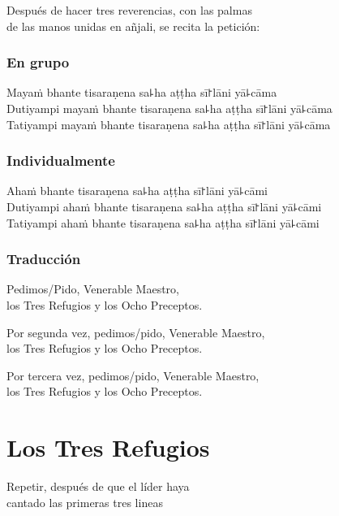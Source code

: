 \begin{instruction}
  Después de hacer tres reverencias, con las palmas\\
  de las manos unidas en añjali, se recita la petición:
\end{instruction}

\subsection{En grupo}

Mayaṁ bhante tisaraṇena sa꜕ha aṭṭha sī꜓lāni yā꜕cāma\\
Dutiyampi mayaṁ bhante tisaraṇena sa꜕ha aṭṭha sī꜓lāni yā꜕cāma\\
Tatiyampi mayaṁ bhante tisaraṇena sa꜕ha aṭṭha sī꜓lāni yā꜕cāma

\subsection{Individualmente}

Ahaṁ bhante tisaraṇena sa꜕ha aṭṭha sī꜓lāni yā꜕cāmi\\
Dutiyampi ahaṁ bhante tisaraṇena sa꜕ha aṭṭha sī꜓lāni yā꜕cāmi\\
Tatiyampi ahaṁ bhante tisaraṇena sa꜕ha aṭṭha sī꜓lāni yā꜕cāmi

\subsection{Traducción}

\begin{english}
  Pedimos/Pido, Venerable Maestro,\\
  \vin los Tres Refugios y los Ocho Preceptos.

  Por segunda vez, pedimos/pido, Venerable Maestro,\\
  \vin los Tres Refugios y los Ocho Preceptos.

  Por tercera vez, pedimos/pido, Venerable Maestro,\\
  \vin los Tres Refugios y los Ocho Preceptos.
\end{english}

\clearpage
\chapter{Los Tres Refugios}

\begin{instruction}
  Repetir, después de que el líder haya\\
  cantado las primeras tres lineas
\end{instruction}

